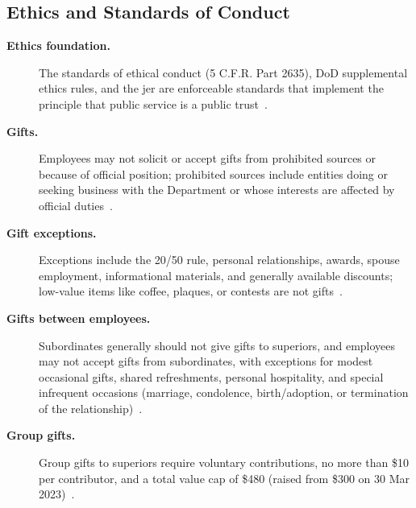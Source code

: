 \documentclass[../main.tex]{subfiles}
\begin{document}
\subsection{Ethics and Standards of Conduct}
\begin{description}
  \item[\textbf{Ethics foundation.}] The standards of ethical conduct (5 C.F.R. Part 2635), DoD supplemental ethics rules, and the \ac{jer} are enforceable standards that implement the principle that public service is a public trust~\autocite{edo-5-1-1-naval-justice-standards-2025,OGE-Standards-Ethical-Conduct-2024,DoD-SOCO-Ethics-Laws-Regulations-2026,DoD-JER-2024}.
  \item[\textbf{Gifts.}] Employees may not solicit or accept gifts from prohibited sources or because of official position; prohibited sources include entities doing or seeking business with the Department or whose interests are affected by official duties~\autocite{edo-5-1-1-naval-justice-standards-2025,OGE-Standards-Ethical-Conduct-2024,DoD-SOCO-Gifts-Deskbook-2025}.
  \item[\textbf{Gift exceptions.}] Exceptions include the 20/50 rule, personal relationships, awards, spouse employment, informational materials, and generally available discounts; low-value items like coffee, plaques, or contests are not gifts~\autocite{edo-5-1-1-naval-justice-standards-2025,OGE-Standards-Ethical-Conduct-2024,DoD-SOCO-Gifts-Deskbook-2025}.
  \item[\textbf{Gifts between employees.}] Subordinates generally should not give gifts to superiors, and employees may not accept gifts from subordinates, with exceptions for modest occasional gifts, shared refreshments, personal hospitality, and special infrequent occasions (marriage, condolence, birth/adoption, or termination of the relationship)~\autocite{edo-5-1-1-naval-justice-standards-2025,OGE-Standards-Ethical-Conduct-2024,DoD-SOCO-Gifts-Deskbook-2025}.
  \item[\textbf{Group gifts.}] Group gifts to superiors require voluntary contributions, no more than \$10 per contributor, and a total value cap of \$480 (raised from \$300 on 30 Mar 2023)~\autocite{edo-5-1-1-naval-justice-standards-2025,DoD-SOCO-Departure-Gifts-2023,DoD-SOCO-Gifts-Deskbook-2025}.
\end{description}
\end{document}
